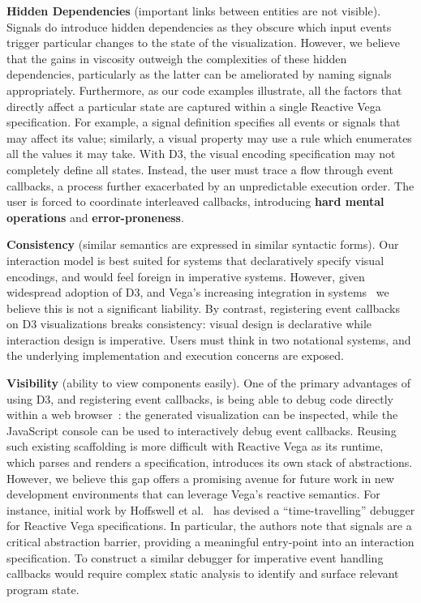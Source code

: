 \textbf{Hidden Dependencies} (important links between entities are not visible).
Signals do introduce hidden dependencies as they obscure which input events
trigger particular changes to the state of the visualization. However, we
believe that the gains in viscosity outweigh the complexities of these hidden
dependencies, particularly as the latter can be ameliorated by naming signals
appropriately. Furthermore, as our code examples illustrate, all the factors
that directly affect a particular state are captured within a single Reactive
Vega specification. For example, a signal definition specifies all events or
signals that may affect its value; similarly, a visual property may use a rule
which enumerates all the values it may take. With D3, the visual encoding
specification may not completely define all states. Instead, the user must trace
a flow through event callbacks, a process further exacerbated by an
unpredictable execution order. The user is forced to coordinate interleaved
callbacks, introducing \textbf{hard mental operations} and
\textbf{error-proneness}.

\textbf{Consistency} (similar semantics are expressed in similar syntactic
forms). Our interaction model is best suited for systems that declaratively
specify visual encodings, and would feel foreign in imperative systems. However,
given widespread adoption of D3, and Vega's increasing integration in
systems~\cite{lyra, voyager, mediawiki:graph} we believe this is not a
significant liability. By contrast, registering event callbacks on D3
visualizations breaks consistency: visual design is declarative while
interaction design is imperative. Users must think in two notational systems,
and the underlying implementation and execution concerns are exposed.

\textbf{Visibility} (ability to view components easily). One of the primary
advantages of using D3, and registering event callbacks, is being able to debug
code directly within a web browser~\cite{bostock:d3}: the generated
visualization can be inspected, while the JavaScript console can be used to
interactively debug event callbacks. Reusing such existing scaffolding is more
difficult with Reactive Vega as its runtime, which parses and renders a
specification, introduces its own stack of abstractions. However, we believe
this gap offers a promising avenue for future work in new development
environments that can leverage Vega's reactive semantics. For instance, initial
work by Hoffswell et al.~\cite{hoffswell:debugging} has devised a
``time-travelling'' debugger for Reactive Vega specifications. In particular,
the authors note that signals are a critical abstraction barrier, providing a
meaningful entry-point into an interaction specification. To construct a similar
debugger for imperative event handling callbacks would require complex static
analysis to identify and surface relevant program state.

